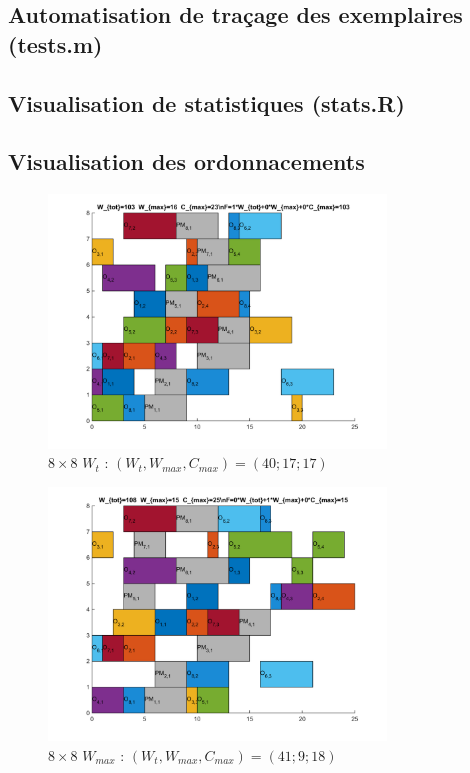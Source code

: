 \documentclass[10pt,a4paper]{scrartcl}
\begin{document}
\subsection{Automatisation de traçage des exemplaires (tests.m)}


\subsection{Visualisation de statistiques (stats.R)}
%

\subsection{Visualisation des ordonnacements}
\label{annexe:visual_ordo}
\begin{figure}
  \centering
  \includegraphics[width=0.8\textwidth]{img/results8x8_Wtot.png}
  \caption{$8 \times 8$ $W_{t}$ : $(W_t, W_{max}, C_{max}) = (40; 17; 17)$}
\end{figure}
\begin{figure}
  \centering
  \includegraphics[width=0.8\textwidth]{img/results8x8_Wmax.png}
  \caption{$8 \times 8$ $W_{max}$ : $(W_t, W_{max}, C_{max}) = (41; 9; 18)$}
\end{figure}
\end{document}
